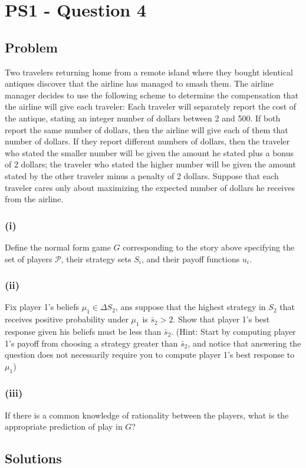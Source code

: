\documentclass[10pt, a4paper]{article}
\begin{document}
\section*{PS1 - Question 4}
  \subsection*{Problem}
    Two travelers returning home from a remote island where they bought identical antiques discover that the airline has managed to smash them. The airline manager decides to use the following scheme to determine the compensation that the airline will give each traveler: Each traveler will separately report the cost of the antique, stating an integer number of dollars between 2 and 500. If both report the same number of dollars, then the airline will give each of them that number of dollars. If they report different numbers of dollars, then the traveler who stated the smaller number will be given the amount he stated plus a bonus of 2 dollars; the traveler who stated the higher number will be given the amount stated by the other traveler minus a penalty of 2 dollars. Suppose that each traveler cares only about maximizing the expected number of dollars he receives from the airline.
    \subsubsection*{(i)}
      Define the normal form game $G$ corresponding to the story above specifying the set of players $\mathcal{P}$, their strategy sets  $S_i$, and their payoff functions $u_i$.
    \subsubsection*{(ii)}
      Fix player 1's beliefs $\mu_1\in\Delta S_2$, ans suppose that the highest strategy in $S_2$ that receives positive probability under $\mu_1$ is $\bar{s}_2>2$. Show that player 1's best response given his beliefs must be less than $\bar{s}_2$. (Hint: Start by computing player 1's payoff from choosing a strategy greater than $\bar{s}_2$, and notice that answering the question does not necessarily require you to compute player 1's best response to $\mu_1$)
    \subsubsection*{(iii)}
      If there is a common knowledge of rationality between the players, what is the appropriate prediction of play in $G$?
  \subsection*{Solutions}
\end{document}
